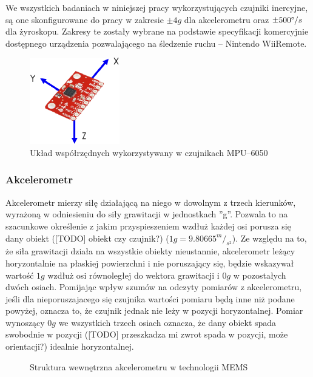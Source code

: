 	We wszystkich badaniach w niniejszej pracy wykorzystujących czujniki inercyjne, są one skonfigurowane do pracy w zakresie  $\pm4g$ dla akcelerometru oraz $\pm500\degree/s$dla żyroskopu. Zakresy te zostały wybrane na podstawie specyfikacji komercyjnie dostępnego urządzenia pozwalającego na śledzenie ruchu -- Nintendo WiiRemote.
	
	\begin{figure}[!htp]
		\centering 
		\includegraphics[width=0.35\textwidth]{images/imuCoordinationSpace.eps}	
		\caption{Układ współrzędnych wykorzystywany w czujnikach MPU--6050}
		\label{fig:characteristics:imu:space}
	\end{figure}
	
	
	\subsubsection*{Akcelerometr}
	Akcelerometr mierzy siłę działającą na niego w dowolnym z trzech kierunków, wyrażoną w odniesieniu do siły grawitacji w jednostkach ''g''. Pozwala to na szacunkowe określenie z jakim przyspieszeniem wzdłuż każdej osi porusza się dany obiekt ([TODO] obiekt czy czujnik?) ($1g =9.80665^m/_{s^2}$). Ze względu na to, że siła grawitacji działa na wszystkie obiekty nieustannie, akcelerometr leżący horyzontalnie na płaskiej powierzchni i nie poruszający się, będzie wskazywał wartość $1g$ wzdłuż osi równoległej do wektora grawitacji i $0g$ w pozostałych dwóch osiach. Pomijając wpływ szumów na odczyty pomiarów z akcelerometru, jeśli dla nieporuszajacego się czujnika wartości pomiaru będą inne niż podane powyżej, oznacza to, że czujnik jednak nie leży w pozycji horyzontalnej. Pomiar wynoszący $0g$ we wszystkich trzech osiach oznacza, że dany obiekt spada swobodnie w pozycji ([TODO] przeszkadza mi zwrot spada w pozycji, może orientacji?) idealnie horyzontalnej.\\
	
	\begin{figure}[!htp]
		
		\caption{Struktura wewnętrzna akcelerometru w technologii MEMS}
		\label{fig:characteristics:imu:acc:mems}
	\end{figure}
	
